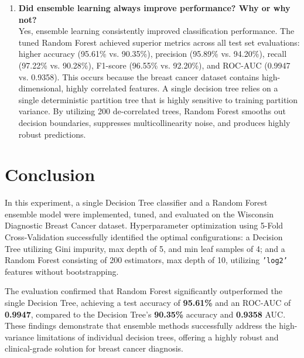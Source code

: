 \documentclass[12pt,a4paper]{article}
\begin{document}
\begin{enumerate}
    \item \textbf{Did ensemble learning always improve performance? Why or why not?}\\
    Yes, ensemble learning consistently improved classification performance. The tuned Random Forest achieved superior metrics across all test set evaluations: higher accuracy (95.61\% vs. 90.35\%), precision (95.89\% vs. 94.20\%), recall (97.22\% vs. 90.28\%), F1-score (96.55\% vs. 92.20\%), and ROC-AUC (0.9947 vs. 0.9358). This occurs because the breast cancer dataset contains high-dimensional, highly correlated features. A single decision tree relies on a single deterministic partition tree that is highly sensitive to training partition variance. By utilizing 200 de-correlated trees, Random Forest smooths out decision boundaries, suppresses multicollinearity noise, and produces highly robust predictions.
\end{enumerate}

\section{Conclusion}
In this experiment, a single Decision Tree classifier and a Random Forest ensemble model were implemented, tuned, and evaluated on the Wisconsin Diagnostic Breast Cancer dataset. Hyperparameter optimization using 5-Fold Cross-Validation successfully identified the optimal configurations: a Decision Tree utilizing Gini impurity, max depth of 5, and min leaf samples of 4; and a Random Forest consisting of 200 estimators, max depth of 10, utilizing \texttt{'log2'} features without bootstrapping. 

The evaluation confirmed that Random Forest significantly outperformed the single Decision Tree, achieving a test accuracy of \textbf{95.61\%} and an ROC-AUC of \textbf{0.9947}, compared to the Decision Tree's \textbf{90.35\%} accuracy and \textbf{0.9358} AUC. These findings demonstrate that ensemble methods successfully address the high-variance limitations of individual decision trees, offering a highly robust and clinical-grade solution for breast cancer diagnosis.
\end{document}

